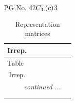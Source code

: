 \documentclass[fleqn,8pt,landscape]{jsarticle}
\begin{document}
\setcounter{MaxMatrixCols}{32}

\renewcommand{\tablename}{Table~}
\renewcommand{\figurename}{Figure~}
\begin{center}
\LARGE
PG No. 42\quad$C_{\rm 3i}(c)$\quad$\bar{3}$\quad[ trigonal ]
\end{center}
\renewcommand{\arraystretch}{1.2}
\begin{longtable}{ccccccc}
\caption{Representation matrices}
 \\
 \hline \hline
Irrep. &  &  &  &  &  &  \\ \hline \endfirsthead

\multicolumn{6}{l}{\tablename\ \thetable{}} \\
 \hline \hline
Irrep. &  &  &  &  &  &  \\ \hline \endhead

 \hline \hline
\multicolumn{6}{r}{\footnotesize\it continued ...} \\ \endfoot

 \hline \hline
\multicolumn{6}{r}{} \\ \endlastfoot


\end{longtable}
\end{document}
